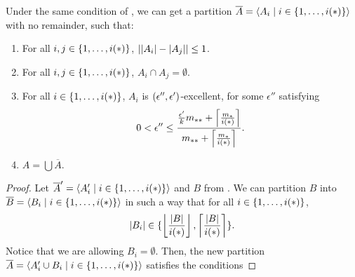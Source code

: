         \begin{lemma} \label{lem:existance_of_excellent_partition_with_equal_size_and_no_remainder}
            Under the same condition of , we can get a
            partition $\overline{A} = \left< A_i \mid i \in \{ 1, \dots, i(*) \} \right>$ with no remainder, such that:
            \begin{enumerate}[label=(\alph*), ref=\alph*]
                \item \label{itm:existance_of_excellent_partition_with_equal_size_and_no_remainder.a}
                    For all $i, j \in \{ 1, \dots, i(*) \}$, $| | A_i |- | A_j | | \leq 1$.
                \item \label{itm:existance_of_excellent_partition_with_equal_size_and_no_remainder.b}
                    For all $i, j \in \{ 1, \dots, i(*) \}$, $A_i \cap A_j = \emptyset$.
                \item \label{itm:existance_of_excellent_partition_with_equal_size_and_no_remainder.c}
                    For all $i \in \{ 1, \dots, i(*) \}$, $A_i$ is $( \epsilon'', \epsilon' )$-excellent, for some $\epsilon''$
                    satisfying
                    \[
                        0 < \epsilon'' \leq \frac{\frac{\epsilon'}{k} m_{**} + \left\lceil \frac{m_*}{i(*)} \right\rceil}{m_{**} + \left\lceil \frac{m_*}{i(*)} \right\rceil}.
                    \]
                \item \label{itm:existance_of_excellent_partition_with_equal_size_and_no_remainder.d} $A = \bigcup \overline{A}$.
            \end{enumerate}
            \begin{proof}
                Let $\overline{A}' = \left< A_i' \mid i \in \{ 1, \dots, i(*) \} \right>$ and $B$ from
                .
                \sloppy We can partition $B$ into \mbox{$\overline{B} = \left< B_i \mid i \in \{ 1, \dots, i(*) \} \right>$}
                in such a way that for all $i \in \{ 1, \dots, i(*) \}$,
                \[
                    |B_i| \in \{ \left\lfloor \frac{| B |}{i(*)} \right\rfloor, \left\lceil \frac{| B |}{i(*)} \right\rceil \}.
                \]
                Notice that we are allowing $B_i = \emptyset$.
                Then, the new partition $\overline{A} = \left< A_i' \cup B_i \mid i \in \{ 1, \dots, i(*) \} \right>$ satisfies
                the conditions

\end{proof}
\end{lemma}
